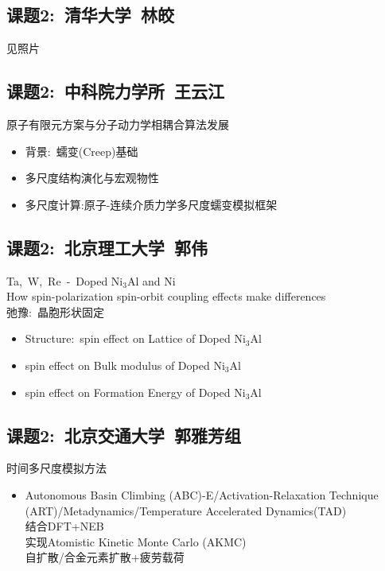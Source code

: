 \documentclass[10pt,a4paper]{article}
\begin{document}
\begin{itemize}
\subsection{课题2:~清华大学~林皎}
见照片

\subsection{课题2:~中科院力学所~王云江}
原子有限元方案与分子动力学相耦合算法发展
\begin{itemize}
	\item 背景:~蠕变\textrm{(Creep)}基础
	\item 多尺度结构演化与宏观物性
	\item 多尺度计算:原子-连续介质力学多尺度蠕变模拟框架
\end{itemize}

\subsection{课题2:~北京理工大学~郭伟}
\textrm{Ta,~W,~Re~-~Doped Ni$_3$Al and Ni}\\
\textrm{How spin-polarization spin-orbit coupling effects make differences}\\
弛豫:~晶胞形状固定\\
\begin{itemize}
	\item \textrm{Structure:~spin effect on Lattice of Doped Ni$_3$Al}
	\item \textrm{spin effect on Bulk modulus of Doped Ni$_3$Al}
	\item \textrm{spin effect on Formation Energy of Doped Ni$_3$Al}
\end{itemize}

\subsection{课题2:~北京交通大学~郭雅芳组}
时间多尺度模拟方法
\begin{itemize}
	\item \textrm{Autonomous Basin Climbing (ABC)-E/Activation-Relaxation Technique (ART)/Metadynamics/Temperature Accelerated Dynamics(TAD)}\\
		结合\textrm{DFT+NEB}\\
		实现\textrm{Atomistic Kinetic Monte Carlo (AKMC)}\\
		自扩散/合金元素扩散+疲劳载荷
\end{itemize}


\end{itemize}
\end{document}
